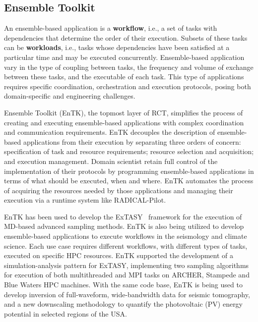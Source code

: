 \subsection{Ensemble Toolkit}

An ensemble-based application is a \textbf{workflow}, i.e., a set of tasks
with dependencies that determine the order of their execution. Subsets of
these tasks can be \textbf{workloads}, i.e., tasks whose dependencies have
been satisfied at a particular time and may be executed concurrently.
Ensemble-based application vary in the type of coupling between tasks, the
frequency and volume of exchange between these tasks, and the executable of
each task. This type of applications requires specific coordination,
orchestration and execution protocols, posing both domain-specific and
engineering challenges.

Ensemble Toolkit (EnTK), the topmost layer of RCT, simplifies the process of
creating and executing ensemble-based applications with complex coordination
and communication requirements. EnTK decouples the description of
ensemble-based applications from their execution by separating three orders
of concern: specification of task and resource requirements; resource
selection and acquisition; and execution management. Domain scientist retain
full control of the implementation of their protocols by programming
ensemble-based applications in terms of what should be executed, when and
where. EnTK automates the process of acquiring the resources needed by those
applications and managing their execution via a runtime system like
RADICAL-Pilot.


EnTK has been used to develop the ExTASY~\cite{balasubramanian2016extasy}
framework for the execution of MD-based advanced sampling methods. EnTK is
also being utilized to develop ensemble-based applications to execute
workflows in the seismology and climate science. Each use case requires
different workflows, with different types of tasks, executed on specific HPC
resources. EnTK supported the development of a simulation-analysis pattern
for ExTASY, implementing two sampling algorithms for execution of both
multithreaded and MPI tasks on ARCHER, Stampede and Blue Waters HPC machines.
With the same code base, EnTK is being used to develop inversion of
full-waveform, wide-bandwidth data for seismic tomography, and a new
downscaling methodology to quantify the photovoltaic (PV) energy potential in
selected regions of the USA\@.

